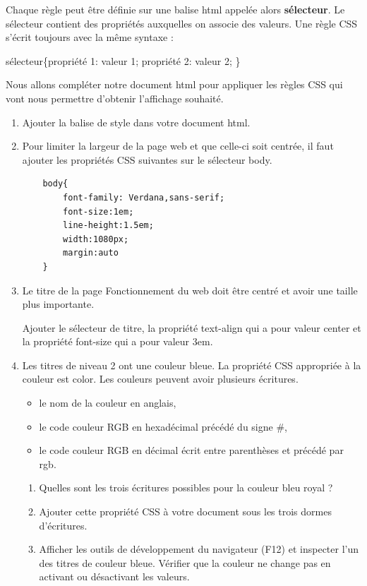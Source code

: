 \documentclass[12pt,a4paper]{article}
\begin{document}
Chaque règle peut être définie sur une balise html appelée alors \textbf{sélecteur}. Le sélecteur contient des propriétés auxquelles on associe des valeurs. Une règle CSS s'écrit toujours avec la même syntaxe : \begin{center}
\textsf{sélecteur\{propriété 1: valeur 1; propriété 2: valeur 2; \}}
\end{center}

Nous allons compléter notre document html pour appliquer les règles CSS qui vont nous permettre d'obtenir l'affichage souhaité.

\begin{enumerate}
\item Ajouter la balise de style dans votre document \textsf{html}.

\item Pour limiter la largeur de la page web et que celle-ci soit centrée, il faut ajouter les propriétés CSS suivantes sur le sélecteur \textsf{body}.

\begin{lstlisting}
	body{
		font-family: Verdana,sans-serif;
		font-size:1em;
		line-height:1.5em;
		width:1080px;
		margin:auto
	}
\end{lstlisting}

\item Le titre de la page \textsf{Fonctionnement du web} doit être centré et avoir une taille plus importante. 

Ajouter le sélecteur de titre, la propriété \textsf{text-align} qui a pour valeur \textsf{center} et la propriété \textsf{font-size} qui a pour valeur \textsf{3em}.

\item Les titres de niveau 2 ont une couleur bleue. La propriété CSS appropriée à la couleur est \textsf{color}. Les couleurs peuvent avoir plusieurs écritures.
\begin{itemize}[label=\textbullet]
\item le nom de la couleur en anglais,
\item le code couleur RGB en hexadécimal précédé du signe \#,
\item le code couleur RGB en décimal écrit entre parenthèses et précédé par \textsf{rgb}.
\end{itemize}
\begin{enumerate}
\item Quelles sont les trois écritures possibles pour la couleur bleu royal ?
\item Ajouter cette propriété CSS à votre document sous les trois dormes d'écritures.
\item Afficher les outils de développement du navigateur (F12) et inspecter l'un des titres de couleur bleue. Vérifier que la couleur ne change pas en activant ou désactivant les valeurs.
\end{enumerate}


\end{enumerate}
\end{document}
